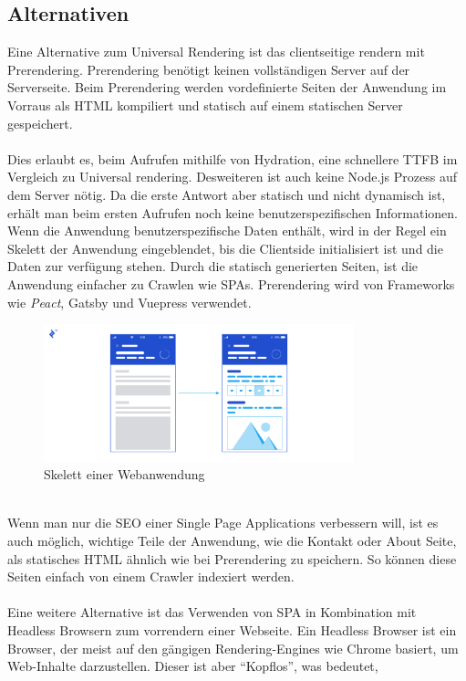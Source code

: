 \documentclass[runningheads]{llncs}
\begin{document}
\subsection{Alternativen}
\label{subsec:Alternativen}
Eine Alternative zum Universal Rendering ist das clientseitige rendern mit Prerendering. 
Prerendering benötigt keinen vollständigen Server auf der Serverseite. 
Beim Prerendering werden vordefinierte Seiten der Anwendung im Vorraus als HTML kompiliert und 
statisch auf einem statischen Server gespeichert. 
\\
\\
Dies erlaubt es, beim Aufrufen mithilfe von Hydration, 
eine schnellere TTFB im Vergleich zu Universal rendering. 
Desweiteren ist auch keine Node.js Prozess auf dem Server nötig. 
Da die erste Antwort aber statisch und nicht dynamisch ist, 
erhält man beim ersten Aufrufen noch keine benutzerspezifischen Informationen. 
Wenn die Anwendung benutzerspezifische Daten enthält, 
wird in der Regel ein Skelett der Anwendung eingeblendet, 
bis die Clientside initialisiert ist und die Daten zur verfügung stehen. 
Durch die statisch generierten Seiten, 
ist die Anwendung einfacher zu Crawlen wie SPAs. 
Prerendering wird von Frameworks wie \textit{Peact}, 
Gatsby und Vuepress verwendet.
\begin{figure}[h]
  \centering
  \includegraphics[width=9cm]{images/WebsiteSceleton}
  \caption{Skelett einer Webanwendung \cite{breux_2018}}
\end{figure}
\\
Wenn man nur die SEO einer Single Page Applications verbessern will, 
ist es auch möglich, 
wichtige Teile der Anwendung, 
wie die Kontakt oder About Seite, 
als statisches HTML ähnlich wie bei Prerendering zu speichern. 
So können diese Seiten einfach von einem Crawler indexiert werden.
\\
\\
Eine weitere Alternative ist das Verwenden von SPA in Kombination mit Headless Browsern zum vorrendern einer Webseite. 
Ein Headless Browser ist ein Browser, 
der meist auf den gängigen Rendering-Engines wie Chrome basiert, 
um Web-Inhalte darzustellen. Dieser ist aber “Kopflos”, was bedeutet, 
\end{document}
